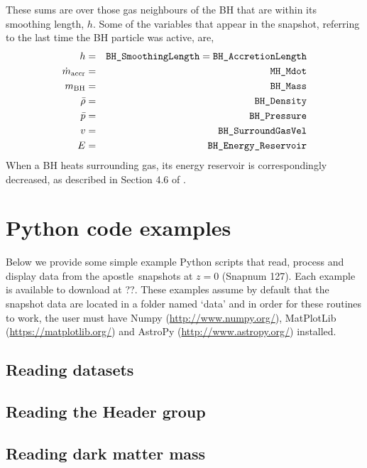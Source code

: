 \documentclass[10pt, a4paper]{article}
\newcommand{\apostle}{{\sc apostle}}
\begin{document}
These sums are over those gas neighbours of the BH that are within its smoothing length, $h$. Some of the variables that appear in the snapshot, referring to the last time the BH particle was active, are,
\begin{eqnarray}
h&=&\hbox{\texttt{BH\_SmoothingLength}}=\hbox{\texttt{BH\_AccretionLength}}\nonumber\\
\dot m_{\rm accr} &=& \hbox{\texttt{MH\_Mdot}}\nonumber\\
m_{\rm BH} &=& \hbox{\texttt{BH\_Mass}}\nonumber\\
\bar{\rho} &=& \hbox{\texttt{BH\_Density}}\nonumber\\
\bar{p} &=& \hbox{\texttt{BH\_Pressure}}\nonumber\\
v &=& \hbox{\texttt{BH\_SurroundGasVel}}\nonumber\\
E &=& \hbox{\texttt{BH\_Energy\_Reservoir}}\nonumber\\
\end{eqnarray}
When a BH heats surrounding gas, its energy reservoir is correspondingly decreased, as described in Section 4.6 of \cite{2015MNRAS.446..521S}.

\section{Python code examples}
\label{SecPythonExamples}

Below we provide some simple example {\sc Python} scripts that read, process and display data from the \apostle\ snapshots at $z=0$ ({\sc Snapnum} 127). Each example is available to download at ??. These examples assume by default that the snapshot data are located in a folder named `data' and in order for these routines to work, the user must have {\sc Numpy} ({\color{blue}\href{http://www.numpy.org/}{http://www.numpy.org/}}), {\sc MatPlotLib} ({\color{blue}\href{https://matplotlib.org/}{https://matplotlib.org/}}) and {\sc AstroPy} ({\color{blue}\href{http://www.astropy.org/}{http://www.astropy.org/}}) installed.

\subsection{Reading datasets}

\subsection{Reading the {\sc Header} group}

\subsection{Reading dark matter mass}
\end{document}
